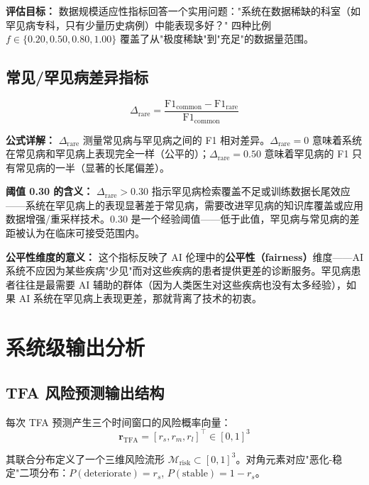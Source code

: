 \documentclass[11pt,a4paper]{ctexart}
\theoremstyle{remark}
\begin{document}
\textbf{评估目标：} 数据规模适应性指标回答一个实用问题："系统在数据稀缺的科室（如罕见病专科，只有少量历史病例）中能表现多好？" 四种比例 $f \in \{0.20, 0.50, 0.80, 1.00\}$ 覆盖了从"极度稀缺"到"充足"的数据量范围。

\subsection{常见/罕见病差异指标}

\begin{equation}
\Delta_{\text{rare}} = \frac{\text{F1}_{\text{common}} - \text{F1}_{\text{rare}}}{\text{F1}_{\text{common}}}
\end{equation}

\textbf{公式详解：} $\Delta_{\text{rare}}$ 测量常见病与罕见病之间的 F1 相对差异。$\Delta_{\text{rare}} = 0$ 意味着系统在常见病和罕见病上表现完全一样（公平的）；$\Delta_{\text{rare}} = 0.50$ 意味着罕见病的 F1 只有常见病的一半（显著的长尾偏差）。

\textbf{阈值 0.30 的含义：} $\Delta_{\text{rare}} > 0.30$ 指示罕见病检索覆盖不足或训练数据长尾效应——系统在罕见病上的表现显著差于常见病，需要改进罕见病的知识库覆盖或应用数据增强/重采样技术。0.30 是一个经验阈值——低于此值，罕见病与常见病的差距被认为在临床可接受范围内。

\textbf{公平性维度的意义：} 这个指标反映了 AI 伦理中的\textbf{公平性（fairness）}维度——AI 系统不应因为某些疾病"少见"而对这些疾病的患者提供更差的诊断服务。罕见病患者往往是最需要 AI 辅助的群体（因为人类医生对这些疾病也没有太多经验），如果 AI 系统在罕见病上表现更差，那就背离了技术的初衷。

\section{系统级输出分析}

\subsection{TFA 风险预测输出结构}

每次 TFA 预测产生三个时间窗口的风险概率向量：
\begin{equation}
\mathbf{r}_{\text{TFA}} = [r_s, r_m, r_l]^{\top} \in [0,1]^{3}
\end{equation}

其联合分布定义了一个三维风险流形 $\mathcal{M}_{\text{risk}} \subset [0,1]^3$。对角元素对应"恶化-稳定"二项分布：$P(\text{deteriorate}) = r_s$, $P(\text{stable}) = 1 - r_s$。
\end{document}
